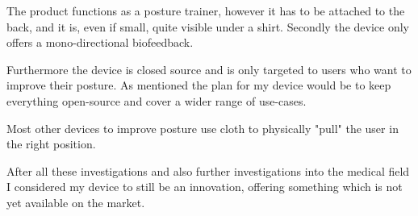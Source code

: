 The product functions as a posture trainer, however it has to be attached to the back, and it is, even if small, quite visible under a shirt. Secondly the device only offers a mono-directional biofeedback. \cite{HowToImp2:online}

Furthermore the device is closed source and is only targeted to users who want to improve their posture. As mentioned the plan for my device would be to keep everything open-source and cover a wider range of use-cases. 

Most other devices to improve posture use cloth to physically "pull" the user in the right position.

After all these investigations and also further investigations into the medical field I considered my device to still be an innovation, offering something which is not yet available on the market.